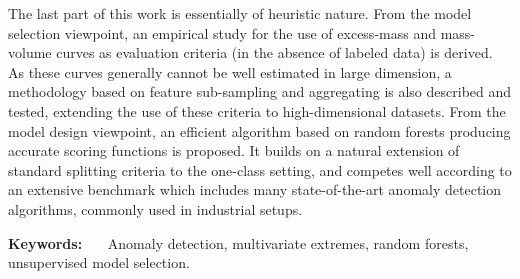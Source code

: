 \documentclass[a4paper, 8pt]{article}
\begin{document}
The last part of this work is essentially of heuristic nature. %
%
From the model selection viewpoint, an empirical study for the use of excess-mass and mass-volume curves as evaluation criteria (in the absence of labeled data) is derived. 
 As these curves generally cannot be well estimated in large dimension,
a methodology based on feature sub-sampling and aggregating is also described and tested, extending the use of these criteria to high-dimensional datasets. %
%
From the model design viewpoint,
an efficient algorithm based on random forests producing accurate scoring functions is proposed. It builds on a natural extension of standard splitting criteria to the one-class setting, and competes well according to an extensive benchmark which includes many state-of-the-art anomaly detection algorithms, commonly used in industrial setups.
\vspace{0.5em}

\textbf{Keywords:} ~~~Anomaly detection, multivariate extremes, random forests, unsupervised model selection.


\end{document}

